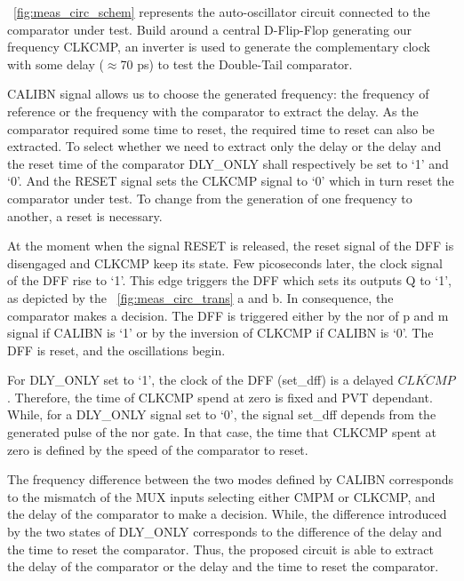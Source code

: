 \figurename~\ref{fig:meas_circ_schem} represents the auto-oscillator circuit connected to the comparator under test. Build around a central D-Flip-Flop generating our frequency CLKCMP, an inverter is used to generate the complementary clock with some delay (\(\approx\)70 ps) to test the Double-Tail comparator.

CALIBN signal allows us to choose the generated frequency: the frequency of reference or the frequency with the comparator to extract the delay. As the comparator required some time to reset, the required time to reset can also be extracted. To select whether we need to extract only the delay or the delay and the reset time of the comparator DLY\_ONLY shall respectively be set to `1' and `0'. And the RESET signal sets the CLKCMP signal to `0' which in turn reset the comparator under test. To change from the generation of one frequency to another, a reset is necessary.

At the moment when the signal RESET is released, the reset signal of the DFF is disengaged and CLKCMP keep its state. Few picoseconds later, the clock signal of the DFF rise to `1'. This edge triggers the DFF which sets its outputs Q to `1', as depicted by the \figurename~\ref{fig:meas_circ_trans} a and b. In consequence, the comparator makes a decision. The DFF is triggered either by the nor of p and m signal if CALIBN is `1' or by the inversion of CLKCMP if CALIBN is `0'. The DFF is reset, and the oscillations begin.

For DLY\_ONLY set to `1', the clock of the DFF (set\_dff) is a delayed \(\overline{CLKCMP}\). Therefore, the time of CLKCMP spend at zero is fixed and PVT dependant. While, for a DLY\_ONLY signal set to `0', the signal set\_dff depends from the generated pulse of the nor gate. In that case, the time that CLKCMP spent at zero is defined by the speed of the comparator to reset.

The frequency difference between the two modes defined by CALIBN corresponds to the mismatch of the MUX inputs selecting either CMPM or CLKCMP, and the delay of the comparator to make a decision. While, the difference introduced by the two states of DLY\_ONLY corresponds to the difference of the delay and the time to reset the comparator. Thus, the proposed circuit is able to extract the delay of the comparator or the delay and the time to reset the comparator.

